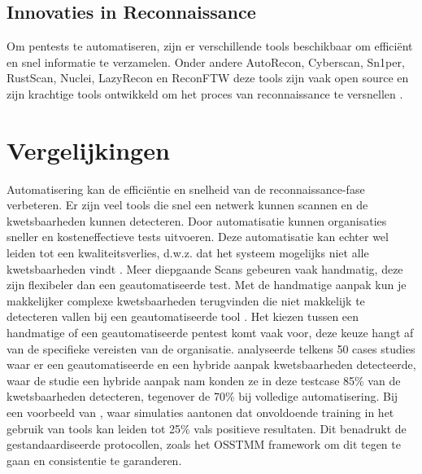 \subsection{Innovaties in Reconnaissance}
Om pentests te automatiseren, zijn er verschillende tools beschikbaar om efficiënt en snel informatie te verzamelen. 
Onder andere AutoRecon, Cyberscan, Sn1per, RustScan, Nuclei, LazyRecon en ReconFTW deze tools zijn vaak open source en zijn krachtige tools ontwikkeld om het proces van reconnaissance te versnellen \autocite{Shebli}.

\section{Vergelijkingen}
Automatisering kan de efficiëntie en snelheid van de reconnaissance-fase verbeteren. Er zijn veel tools die snel een netwerk kunnen scannen en de kwetsbaarheden kunnen detecteren. 
Door automatisatie kunnen organisaties sneller en kosteneffectieve tests uitvoeren. Deze automatisatie kan echter wel leiden tot een kwaliteitsverlies, d.w.z. dat het systeem mogelijks niet alle kwetsbaarheden vindt \parencite{peris}. 
Meer diepgaande Scans gebeuren vaak handmatig, deze zijn flexibeler dan een geautomatiseerde test. Met de handmatige aanpak kun je makkelijker complexe kwetsbaarheden terugvinden die niet makkelijk te detecteren vallen bij een geautomatiseerde tool \parencite{techtarget2023}. 
Het kiezen tussen een handmatige of een geautomatiseerde pentest komt vaak voor, deze keuze hangt af van de specifieke vereisten van de organisatie. \textcite{Monero2025} analyseerde telkens 50 cases studies waar er een geautomatiseerde en een hybride aanpak kwetsbaarheden detecteerde, waar de studie een hybride aanpak nam konden ze in deze testcase 85\% van de kwetsbaarheden detecteren, tegenover de 70\% bij volledige automatisering.
Bij een voorbeeld van \parencite{Whitaker2005}, waar simulaties aantonen dat onvoldoende training in het gebruik van tools kan leiden tot 25\% vals positieve resultaten.
Dit benadrukt de gestandaardiseerde protocollen, zoals het OSSTMM framework om dit tegen te gaan en consistentie te garanderen.

